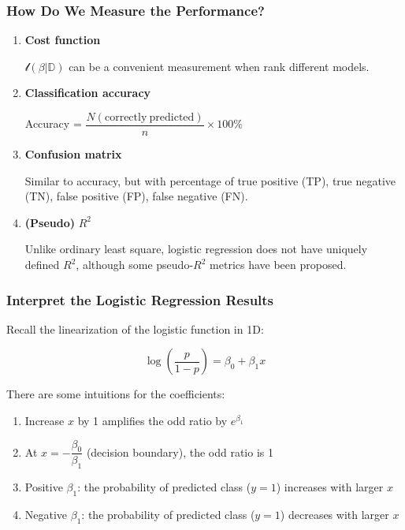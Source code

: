 \documentclass[10pt,aspectratio=169]{beamer}
\begin{document}
      \begin{frame}
        \frametitle{How Do We Measure the Performance?}
        \begin{enumerate}
          \vfill \item \textbf{Cost function}
          
          $\mathscr{l}(\beta | \mathbb{D})$ can be a convenient
          measurement when rank different models.
          
          \vfill \item \textbf{Classification accuracy}
          
          Accuracy =
          $\dfrac{N(\mathrm{correctly\ predicted})}{n} \times 100\%$
          
          \vfill \item \textbf{Confusion matrix}

          Similar to accuracy, but with percentage of true positive
          (TP), true negative (TN), false positive (FP), false
          negative (FN).
          
          \vfill \item \textbf{(Pseudo)} $R^{2}$

          Unlike ordinary least square, logistic regression does not
          have uniquely defined $R^{2}$, although some pseudo-$R^{2}$
          metrics have been proposed.%
          \let\thefootnote\relax{}
        \end{enumerate}
        
      \end{frame}

      \begin{frame}
        \frametitle{Interpret the Logistic Regression Results}
        Recall the linearization of the logistic function in 1D:

        \begin{equation*}
          \log \left(\frac{p}{1 - p}\right) = \beta_{0} + \beta_{1}x
        \end{equation*}

        There are some intuitions for the coefficients:
        \begin{enumerate}
          \vfill \item Increase $x$ by 1 amplifies the odd ratio by
          $e^{\beta_{1}}$ \vfill \item At
          $x = - \dfrac{\beta_{0}}{\beta_{1}}$ (decision boundary),
          the odd ratio is 1 \vfill \item Positive $\beta_{1}$: the
          probability of predicted class ($y=1$) increases with larger
          $x$ \vfill \item Negative $\beta_{1}$: the probability of
          predicted class ($y=1$) decreases with larger $x$
        \end{enumerate}
      \end{frame}
\end{document}
